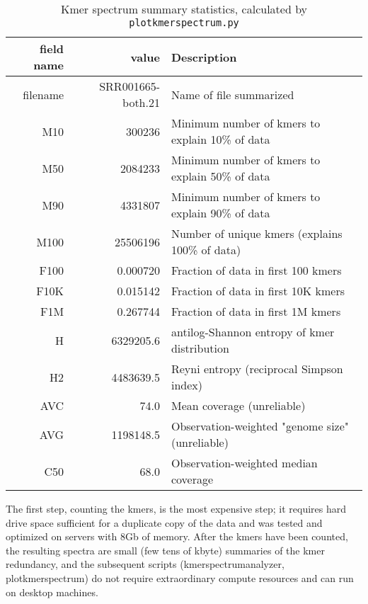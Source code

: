 \documentclass[11pt,fullpage]{article}
\begin{document}
\begin{table}
\begin{tabular}{rrl}
field name & value & Description \\
\hline 
filename	 & SRR001665-both.21 & Name of file summarized \\
M10  & 300236	 & Minimum number of kmers to explain 10\% of data\\
M50  & 2084233	 & Minimum number of kmers to explain 50\% of data \\
M90  & 4331807	 & Minimum number of kmers to explain 90\% of data \\
M100 & 25506196	 & Number of unique kmers  (explains 100\% of data)\\
F100 & 0.000720	 & Fraction of data in first 100 kmers\\
F10K & 0.015142	 & Fraction of data in first 10K kmers \\
F1M &  0.267744 &  Fraction of data in first 1M kmers  \\
H & 6329205.6	 &  antilog-Shannon entropy of kmer distribution \\
H2 & 4483639.5	 &  Reyni entropy (reciprocal Simpson index)  \\
AVC & 74.0	 &  Mean coverage  (unreliable) \\
AVG & 1198148.5	 &   Observation-weighted "genome size" (unreliable)\\
C50 & 68.0       &   Observation-weighted median coverage  \\
\hline 
\end{tabular}
\caption{Kmer spectrum summary statistics, calculated by \texttt{plotkmerspectrum.py} } 
\label{statisticstable}
\end{table}

The first step, counting the kmers, is the most expensive step; it requires 
hard drive space sufficient for a duplicate copy of the data and was tested
and optimized on servers with 8Gb of memory.  After the kmers have been
counted, the resulting spectra are small (few tens of kbyte) summaries of
the kmer redundancy, and the subsequent scripts (kmerspectrumanalyzer,
plotkmerspectrum) do not require extraordinary compute resources and
can run on desktop machines.
\end{document}
